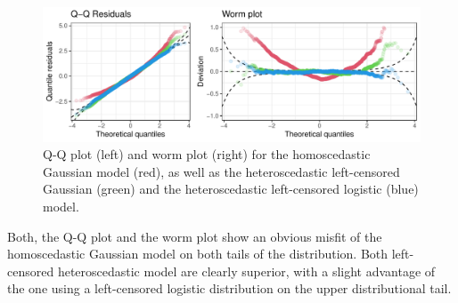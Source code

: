 \documentclass[twoside]{report}
\begin{document}
\begin{figure}[!ht]\centering
    \includegraphics[width=\textwidth]{Stauffer-qqresiduals}
    \caption{\label{stauffer:fig2} 
        Q-Q plot (left) and worm plot (right) for the homoscedastic
        Gaussian model (red), as well as the heteroscedastic left-censored
        Gaussian (green) and the heteroscedastic left-censored logistic (blue) model.
    }
\end{figure}


Both, the Q-Q plot and the worm plot show an obvious misfit of the 
homoscedastic Gaussian model on both tails of the distribution.
Both left-censored heteroscedastic model are clearly superior, with
a slight advantage of the one using a left-censored logistic distribution
on the upper distributional tail.




\end{document}
